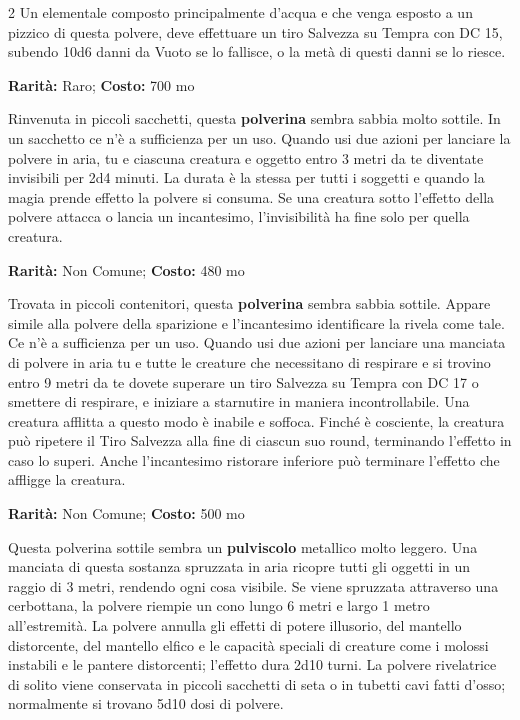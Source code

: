 \begin{multicols}{2}
Un elementale composto principalmente d'acqua e che venga esposto a un pizzico di questa polvere, deve effettuare un tiro Salvezza su Tempra con DC 15, subendo 10d6 danni da Vuoto se lo fallisce, o la metà di questi danni se lo riesce.


\textbf{Rarità:} Raro; \textbf{Costo:} 700 mo

Rinvenuta in piccoli sacchetti, questa \textbf{polverina} sembra sabbia molto sottile. In un sacchetto ce n'è a sufficienza per un uso. Quando usi due azioni per lanciare la polvere in aria, tu e ciascuna creatura e oggetto entro 3 metri da te diventate invisibili per 2d4 minuti. La durata è la stessa per tutti i soggetti e quando la magia prende effetto la polvere si consuma. Se una creatura sotto l'effetto della polvere attacca o lancia un incantesimo, l'invisibilità ha fine solo per quella creatura.


\textbf{Rarità:} Non Comune; \textbf{Costo:} 480 mo

Trovata in piccoli contenitori, questa \textbf{polverina} sembra sabbia sottile. Appare simile alla polvere della sparizione e l'incantesimo identificare la rivela come tale. Ce n'è a sufficienza per un uso. Quando usi due azioni per lanciare una manciata di polvere in aria tu e tutte le creature che necessitano di respirare e si trovino entro 9 metri da te dovete superare un tiro Salvezza su Tempra con DC 17 o smettere di respirare, e iniziare a starnutire in maniera incontrollabile. Una creatura afflitta a questo modo è inabile e soffoca. Finché è cosciente, la creatura può ripetere il Tiro Salvezza alla fine di ciascun suo round, terminando l'effetto in caso lo superi. Anche l'incantesimo ristorare inferiore può terminare l'effetto che affligge la creatura.


\textbf{Rarità:} Non Comune; \textbf{Costo:} 500 mo

Questa polverina sottile sembra un \textbf{pulviscolo} metallico molto leggero. Una manciata di questa sostanza spruzzata in aria ricopre tutti gli oggetti in un raggio di 3 metri, rendendo ogni cosa visibile. Se viene spruzzata attraverso una cerbottana, la polvere riempie un cono lungo 6 metri e largo 1 metro all'estremità. La polvere annulla gli effetti di potere illusorio, del mantello distorcente, del mantello elfico e le capacità speciali di creature come i molossi instabili e le pantere distorcenti; l'effetto dura 2d10 turni. La polvere rivelatrice di solito viene conservata in piccoli sacchetti di seta o in tubetti cavi fatti d'osso; normalmente si trovano 5d10 dosi di polvere.


\end{multicols}

